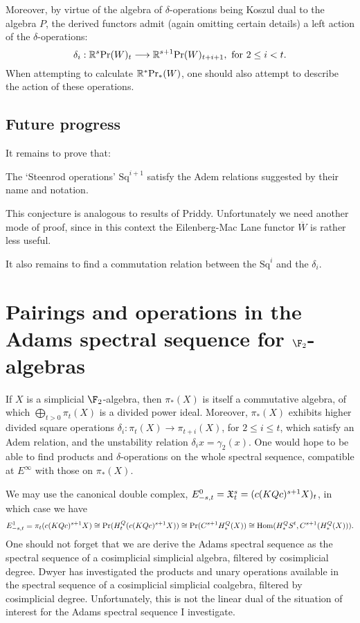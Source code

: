 \documentclass[11pt]{article}
\newcommand{\Sq}{\mathrm{Sq}}
\begin{document}
Moreover, by virtue of the algebra of $\delta$-operations being Koszul dual to the algebra $P$, the derived functors admit (again omitting certain details) a left action of the $\delta$-operations:
\[\delta_i:\mathbb{R}^s\textup{Pr}(W)_t\to \mathbb{R}^{s+1}\textup{Pr}(W)_{t+i+1},\textup{ for $2\leq i<t$}.\]
When attempting to calculate $\mathbb{R}^*\textup{Pr}_*(W)$, one should also attempt to describe the action of these operations.


\subsection{Future progress}
It remains to prove that:
\begin{conjecture}
The `Steenrod operations' $\Sq^{i+1}$ satisfy the Adem relations suggested by their name and notation.
\end{conjecture}
\noindent This conjecture is analogous to results \cite[5.3]{PriddySimplicialLie.pdf} of Priddy. Unfortunately we need another mode of proof, since in this context the Eilenberg-Mac Lane functor $\overline{W}$ is rather less useful.

It also remains to find a commutation relation between the $\Sq^i$ and the $\delta_i$.

\section{Pairings and operations in the Adams spectral sequence for $\F_2$-algebras}
If $X$ is a simplicial $\F_2$-algebra, then $\pi_*(X)$ is itself a commutative algebra, of which $\bigoplus_{t>0}\pi_{t}(X)$ is a divided power ideal. Moreover, $\pi_*(X)$ exhibits higher divided square operations $\delta_i:\pi_t(X)\to \pi_{t+i}(X)$, for $2\leq i \leq t$, which satisfy an Adem relation, and the unstability relation $\delta_ix=\gamma_2(x)$. One would hope to be able to find products and $\delta$-operations on the whole spectral sequence, compatible at $E^\infty$ with those on $\pi_*(X)$.

We may use the canonical double complex, $E^0_{-s,t}=\frakX^s_t=(c(KQc)^{s+1}X)_t$, in which case we have 
\[E^1_{-s,t}=\pi_t(c(KQc)^{s+1}X)\cong \textup{Pr}(H_t^Q(c(KQc)^{s+1}X))\cong \textup{Pr}(C^{s+1}H_*^Q(X))\cong \Hom(H_*^QS^t,C^{s+1}(H^Q_*(X))).\]
One should not forget that we are derive the Adams spectral sequence as the spectral sequence of a cosimplicial simplicial algebra, filtered by cosimplicial degree. Dwyer \cite{DwyerHigherDividedSquares.pdf} has investigated the products and unary operations available in the spectral sequence of a cosimplicial simplicial coalgebra, filtered by cosimplicial degree. Unfortunately, this is not the linear dual of the situation of interest for the Adams spectral sequence I investigate.
\end{document}
